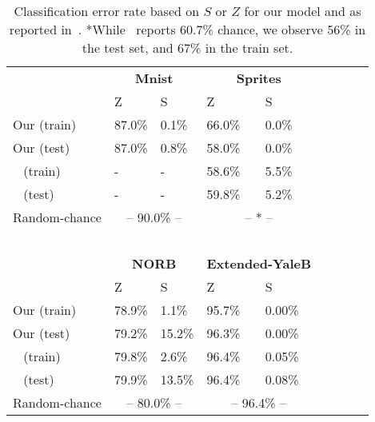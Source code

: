 \documentclass[10pt,twocolumn,letterpaper]{article}
\begin{document}
\begin{table}[]
\centering
\label{tbl1_numericresults}
\begin{small}
\begin{tabular}{lllllllll}
\toprule
                               & \multicolumn{2}{c}{\textbf{Mnist}} & \multicolumn{2}{c}{\textbf{Sprites}}   \\
\cmidrule{2-3}
\cmidrule{4-5}
                               & Z               & S                & Z                  & S \\ \midrule
Our (train)                          &   87.0\%              &    0.1\%              & 66.0\%               & 0.0\%   \\
Our (test)                           & 87.0\%            & 0.8\%            & 58.0\%               & 0.0\%    \\
~\cite{disentanglement} (train) & -               & -                & 58.6\%               & 5.5\%       \\
~\cite{disentanglement} (test)  & -               & -                & 59.8\%               & 5.2\%       \\
Random-chance                  & \multicolumn{2}{c}{-- 90.0\% --}           & \multicolumn{2}{c}{-- * --}  \\
\bottomrule
~\\
\toprule
                               & \multicolumn{2}{c}{\textbf{NORB}} & \multicolumn{2}{c}{\textbf{Extended-YaleB}} \\
\cmidrule{2-3}
\cmidrule{4-5}
                               & Z               & S                & Z                  & S \\ \midrule
Our (train)                          & 78.9\%          & 1.1\%           & 95.7\%               & 0.00\%                    \\
Our (test)                           & 79.2\%          & 15.2\%          & 96.3\%               & 0.00\%                    \\
~\cite{disentanglement} (train) &  79.8\%          & 2.6\%           & 96.4\%               & 0.05\%               \\
~\cite{disentanglement} (test)  &  79.9\%          & 13.5\%          & 96.4\%               & 0.08\%               \\
Random-chance                  & \multicolumn{2}{c}{-- 80.0\% --}          & \multicolumn{2}{c}{-- 96.4\% --}   \\


\bottomrule
\end{tabular}
\end{small}
\smallskip
\caption{Classification error rate based on $S$ or $Z$ for our model and as reported in~\cite{disentanglement}. *While~\cite{disentanglement} reports 60.7\% chance, we observe 56\% in the test set, and 67\% in the train set.}
\end{table}
\end{document}
